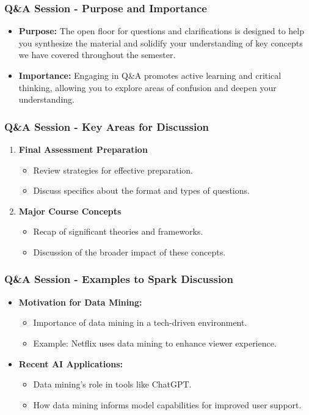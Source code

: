 \documentclass[aspectratio=169]{beamer}
\begin{document}
\begin{frame}[fragile]
    \frametitle{Q\&A Session - Purpose and Importance}
    \begin{itemize}
        \item \textbf{Purpose:} The open floor for questions and clarifications is designed to help you synthesize the material and solidify your understanding of key concepts we have covered throughout the semester.
        \item \textbf{Importance:} Engaging in Q\&A promotes active learning and critical thinking, allowing you to explore areas of confusion and deepen your understanding.
    \end{itemize}
\end{frame}

\begin{frame}[fragile]
    \frametitle{Q\&A Session - Key Areas for Discussion}
    \begin{enumerate}
        \item \textbf{Final Assessment Preparation}
            \begin{itemize}
                \item Review strategies for effective preparation.
                \item Discuss specifics about the format and types of questions.
            \end{itemize}
        \item \textbf{Major Course Concepts}
            \begin{itemize}
                \item Recap of significant theories and frameworks.
                \item Discussion of the broader impact of these concepts.
            \end{itemize}
    \end{enumerate}
\end{frame}

\begin{frame}[fragile]
    \frametitle{Q\&A Session - Examples to Spark Discussion}
    \begin{itemize}
        \item \textbf{Motivation for Data Mining:}
            \begin{itemize}
                \item Importance of data mining in a tech-driven environment.
                \item Example: Netflix uses data mining to enhance viewer experience.
            \end{itemize}
        \item \textbf{Recent AI Applications:}
            \begin{itemize}
                \item Data mining's role in tools like ChatGPT.
                \item How data mining informs model capabilities for improved user support.
            \end{itemize}
    \end{itemize}
\end{frame}
\end{document}
